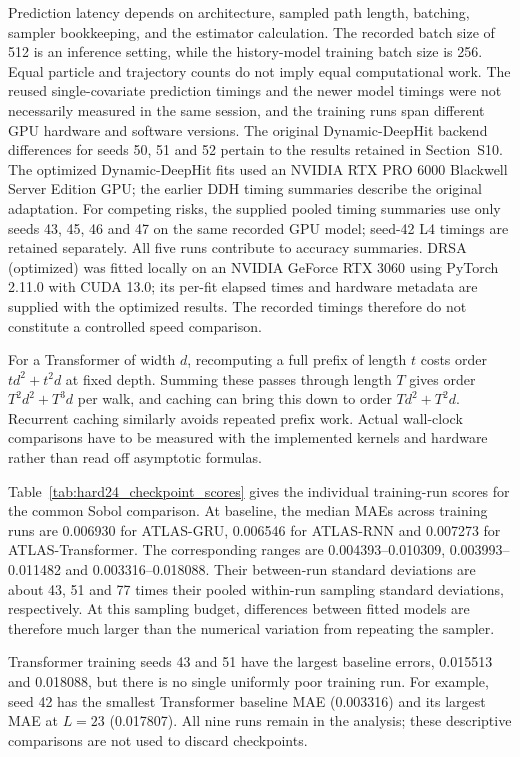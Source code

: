 Prediction latency depends on architecture, sampled path length, batching, sampler bookkeeping, and the estimator calculation. The recorded batch size of 512 is an inference setting, while the history-model training batch size is 256. Equal particle and trajectory counts do not imply equal computational work. The reused single-covariate prediction timings and the newer model timings were not necessarily measured in the same session, and the training runs span different GPU hardware and software versions. The original Dynamic-DeepHit backend differences for seeds 50, 51 and 52 pertain to the results retained in Section~S10. The optimized Dynamic-DeepHit fits used an NVIDIA RTX PRO 6000 Blackwell Server Edition GPU; the earlier DDH timing summaries describe the original adaptation. For competing risks, the supplied pooled timing summaries use only seeds 43, 45, 46 and 47 on the same recorded GPU model; seed-42 L4 timings are retained separately. All five runs contribute to accuracy summaries. DRSA (optimized) was fitted locally on an NVIDIA GeForce RTX 3060 using PyTorch 2.11.0 with CUDA 13.0; its per-fit elapsed times and hardware metadata are supplied with the optimized results. The recorded timings therefore do not constitute a controlled speed comparison.

For a Transformer of width $d$, recomputing a full prefix of length $t$ costs order $td^2+t^2d$ at fixed depth. Summing these passes through length $T$ gives order $T^2d^2+T^3d$ per walk, and caching can bring this down to order $Td^2+T^2d$. Recurrent caching similarly avoids repeated prefix work. Actual wall-clock comparisons have to be measured with the implemented kernels and hardware rather than read off asymptotic formulas.



Table~\ref{tab:hard24_checkpoint_scores} gives the individual training-run scores for the common Sobol comparison. At baseline, the median MAEs across training runs are 0.006930 for ATLAS-GRU, 0.006546 for ATLAS-RNN and 0.007273 for ATLAS-Transformer. The corresponding ranges are 0.004393--0.010309, 0.003993--0.011482 and 0.003316--0.018088. Their between-run standard deviations are about 43, 51 and 77 times their pooled within-run sampling standard deviations, respectively. At this sampling budget, differences between fitted models are therefore much larger than the numerical variation from repeating the sampler.

Transformer training seeds 43 and 51 have the largest baseline errors, 0.015513 and 0.018088, but there is no single uniformly poor training run. For example, seed 42 has the smallest Transformer baseline MAE (0.003316) and its largest MAE at $L=23$ (0.017807). All nine runs remain in the analysis; these descriptive comparisons are not used to discard checkpoints.

